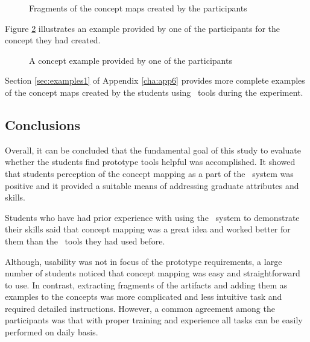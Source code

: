 \begin{figure}[htb]
\centering
\setlength\fboxsep{0pt}
\setlength\fboxrule{0.5pt}
\caption{Fragments of the concept maps created by the participants}
\label{fig:stdmap}
\end{figure}

\FloatBarrier

Figure \ref{fig:stdmap2} illustrates an example provided by one of the
participants for the concept they had created.

\begin{figure}[htb]
\centering
\setlength\fboxsep{0pt}
\setlength\fboxrule{0.5pt}
\caption{A concept example provided by one of the participants}
\label{fig:stdmap2}
\end{figure}

Section \ref{sec:examples1} of Appendix \ref{cha:app6} provides more complete
examples of the concept maps created by the students using \ep~tools during the
experiment.

\subsection{Conclusions}

Overall, it can be concluded that the fundamental goal of this study to
evaluate whether the students find prototype tools helpful was accomplished. It
showed that students perception of the concept mapping as a part of the
\ep~system was positive and it provided a suitable means of addressing graduate
attributes and \LLLs skills.

Students who have had prior experience with using the \ep~system to demonstrate
their \LLLs skills said that concept mapping was a great idea and worked better
for them than the \ep~tools they had used before.

Although, usability was not in focus of the prototype requirements, a large
number of students noticed that concept mapping was easy and straightforward to
use. In contrast, extracting fragments of the artifacts and adding them as
examples to the concepts was more complicated and less intuitive task and
required detailed instructions. However, a common agreement among the
participants was that with proper training and experience all tasks can be
easily performed on daily basis.

